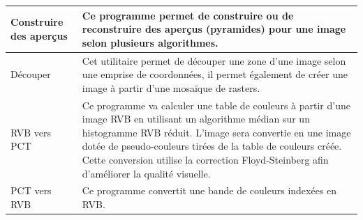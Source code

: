 {\begin{longtable}{|p{3cm}|p{13cm}|}
\hline Construire des aperçus & Ce programme permet de construire ou de reconstruire des aperçus (pyramides) pour une image selon plusieurs algorithmes.\\
\hline Découper & Cet utilitaire permet de découper une zone d'une image selon une emprise de coordonnées, il permet également de créer une image à partir d'une mosaïque de rasters. \\
\hline RVB vers PCT & Ce programme va calculer une table de couleurs à partir d'une image RVB en utilisant un algorithme médian sur un histogramme RVB réduit. L'image sera convertie en une image dotée de pseudo-couleurs tirées de la table de couleurs créée. Cette conversion utilise la correction Floyd-Steinberg afin d'améliorer la qualité visuelle. \\
PCT vers RVB & Ce programme convertit une bande de couleurs indexées en RVB.\\
\end{longtable}

}

